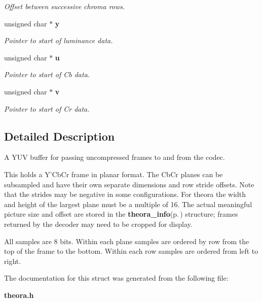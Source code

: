 \begin{CompactItemize}
\begin{CompactList}\small\item\em Offset between successive chroma rows. \item\end{CompactList}\item 
unsigned char $\ast$ {\bf y}\label{structyuv__buffer_34464280b291ac3b8ffd8a6fd0ee2ce9}

\begin{CompactList}\small\item\em Pointer to start of luminance data. \item\end{CompactList}\item 
unsigned char $\ast$ {\bf u}\label{structyuv__buffer_05bc01e25bbad6c86e81c58997cbbe89}

\begin{CompactList}\small\item\em Pointer to start of Cb data. \item\end{CompactList}\item 
unsigned char $\ast$ {\bf v}\label{structyuv__buffer_2638f17c1f26aee27072148c3155b404}

\begin{CompactList}\small\item\em Pointer to start of Cr data. \item\end{CompactList}\end{CompactItemize}


\subsection{Detailed Description}
A YUV buffer for passing uncompressed frames to and from the codec. 

This holds a Y'Cb\-Cr frame in planar format. The Cb\-Cr planes can be subsampled and have their own separate dimensions and row stride offsets. Note that the strides may be negative in some configurations. For theora the width and height of the largest plane must be a multiple of 16. The actual meaningful picture size and offset are stored in the {\bf theora\_\-info}{\rm (p.\,\pageref{structtheora__info})} structure; frames returned by the decoder may need to be cropped for display.

All samples are 8 bits. Within each plane samples are ordered by row from the top of the frame to the bottom. Within each row samples are ordered from left to right. 



The documentation for this struct was generated from the following file:\begin{CompactItemize}
\item 
{\bf theora.h}\end{CompactItemize}

